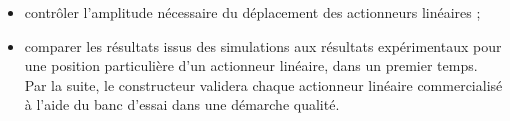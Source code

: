 \begin{itemize}
  \item contrôler l'amplitude nécessaire du déplacement des actionneurs linéaires ;
  \item comparer les résultats issus des simulations aux résultats expérimentaux pour une position particulière d'un actionneur linéaire, dans un premier temps.\\
Par la suite, le constructeur validera chaque actionneur linéaire commercialisé à l'aide du banc d'essai dans une démarche qualité.
\end{itemize}
\fi